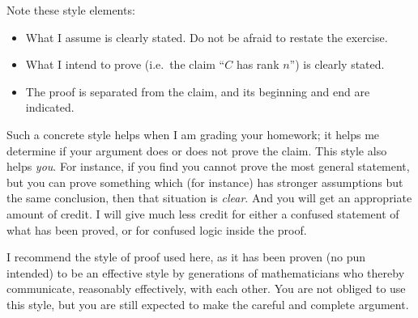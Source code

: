 \documentclass[12pt]{amsart}
\begin{document}
\noindent Note these style elements:
\begin{itemize}
\item What I assume is clearly stated.  Do not be afraid to restate the exercise.
\item What I intend to prove (i.e.~the claim ``$C$ has rank $n$'') is clearly stated.
\item The proof is separated from the claim, and its beginning and end are indicated.
\end{itemize}
\medskip

Such a concrete style helps when I am grading your homework; it helps me determine if your argument does or does not prove the claim.  This style also helps \emph{you}.  For instance, if you find you cannot prove the most general statement, but you can prove something which (for instance) has stronger assumptions but the same conclusion, then that situation is \emph{clear}.  And you will get an appropriate amount of credit.  I will give much less credit for either a confused statement of what has been proved, or for confused logic inside the proof.
\medskip

I recommend the style of proof used here, as it has been proven (no pun intended) to be an effective style by generations of mathematicians who thereby communicate, reasonably effectively, with each other.  You are not obliged to use this style, but you are still expected to make the careful and complete argument.
\end{document}
